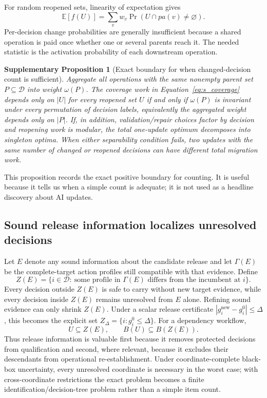 \documentclass[11pt,letterpaper]{article}
\theoremstyle{plain}
\newtheorem{proposition}{Supplementary Proposition}
\newcommand{\1}{\mathbf 1}
\begin{document}
For random reopened sets, linearity of expectation gives
\begin{equation}
\mathbb E[f(U)]=\sum_v w_v\Pr\!\left(U\cap pa(v)\neq\varnothing\right).
\label{eq:s_expected_coverage}
\end{equation}
Per-decision change probabilities are generally insufficient because a shared operation is paid once whether one or several parents reach it. The needed statistic is the activation probability of each downstream operation.

\begin{proposition}[Exact boundary for when changed-decision count is sufficient]
Aggregate all operations with the same nonempty parent set $P\subseteq\mathcal D$ into weight $\omega(P)$. The coverage work in Equation~\ref{eq:s_coverage} depends only on $|U|$ for every reopened set $U$ if and only if $\omega(P)$ is invariant under every permutation of decision labels, equivalently the aggregated weight depends only on $|P|$. If, in addition, validation/repair choices factor by decision and reopening work is modular, the total one-update optimum decomposes into singleton optima. When either separability condition fails, two updates with the same number of changed or reopened decisions can have different total migration work.
\end{proposition}
This proposition records the exact positive boundary for counting. It is useful because it tells us when a simple count is adequate; it is not used as a headline discovery about AI updates.

\subsection{Sound release information localizes unresolved decisions}
Let $E$ denote any sound information about the candidate release and let $\Gamma(E)$ be the complete-target action profiles still compatible with that evidence. Define
\begin{equation}
Z(E)=\{i\in\mathcal D:\ \text{some profile in }\Gamma(E)\text{ differs from the incumbent at }i\}.
\label{eq:s_unresolved}
\end{equation}
Every decision outside $Z(E)$ is safe to carry without new target evidence, while every decision inside $Z(E)$ remains unresolved from $E$ alone. Refining sound evidence can only shrink $Z(E)$. Under a scalar release certificate $|g_i^{\mathrm{new}}-g_i^0|\le\Delta$, this becomes the explicit set $Z_\Delta=\{i:g_i^0\le\Delta\}$. For a dependency workflow,
\begin{equation}
U\subseteq Z(E),\qquad B(U)\subseteq B(Z(E)).
\label{eq:s_scope}
\end{equation}
Thus release information is valuable first because it removes protected decisions from qualification and second, where relevant, because it excludes their descendants from operational re-establishment. Under coordinate-complete black-box uncertainty, every unresolved coordinate is necessary in the worst case; with cross-coordinate restrictions the exact problem becomes a finite identification/decision-tree problem rather than a simple item count.
\end{document}
